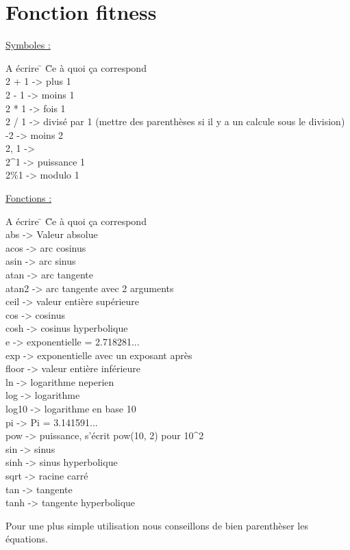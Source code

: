 \documentclass[a4paper,11pt]{article}
\begin{document}
\section{Fonction fitness}
	\underline{Symboles :}\\
\begin{tabbing}
A écrire	\hspace{0.5cm} \=	\hspace{1cm}  \=Ce à quoi ça correspond\\
2 + 1		\>->  plus 1\\
2 - 1		\>->  moins 1\\
2 * 1		\>->  fois 1\\
2 / 1		\>->  divisé par 1 (mettre des parenthèses si il y a un calcule sous le division)\\
-2			\>-> \>moins 2\\
2, 1		\>-> \>1\\
2\^{}1			\>->  puissance 1\\
2\%1		\>->  modulo 1\\
\end{tabbing}

	\underline{Fonctions :}\\
\begin{tabbing}
A écrire	\hspace{0.5cm} \=	\hspace{1cm}  \=Ce à quoi ça correspond\\
abs			\>->	\>Valeur absolue\\
acos		\>->	\>arc cosinus\\
asin		\>->	\>arc sinus\\
atan		\>->	\>arc tangente\\
atan2		\>->	\>arc tangente avec 2 arguments\\
ceil		\>->	\>valeur entière supérieure\\
cos			\>->	\>cosinus\\
cosh		\>->	\>cosinus hyperbolique\\
e			\>->	\>exponentielle = 2.718281...\\
exp			\>->	\>exponentielle avec un exposant après\\
floor		\>->	\>valeur entière inférieure\\
ln			\>->  \>logarithme neperien\\
log			\>->  \>logarithme\\
log10		\>->	\>logarithme en base 10\\
pi			\>->	\>Pi = 3.141591...\\
pow			\>->	\>puissance, s'écrit pow(10, 2) pour 10\^{}2\\
sin			\>->	\>sinus\\
sinh		\>->	\>sinus hyperbolique\\
sqrt		\>->	\>racine carré\\
tan			\>->	\>tangente\\
tanh		\>->	\>tangente hyperbolique\\
\end{tabbing}
Pour une plus simple utilisation nous conseillons de bien parenthèser les équations.\\
\end{document}
